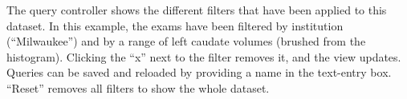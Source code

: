 \label{fig:query}
The query controller shows the different filters that have been applied to this dataset. In this example, the exams have been filtered by institution (``Milwaukee'') and by a range of left caudate volumes (brushed from the histogram). Clicking the ``x'' next to the filter removes it, and the view updates. Queries can be saved and reloaded by providing a name in the text-entry box. ``Reset'' removes all filters to show the whole dataset.